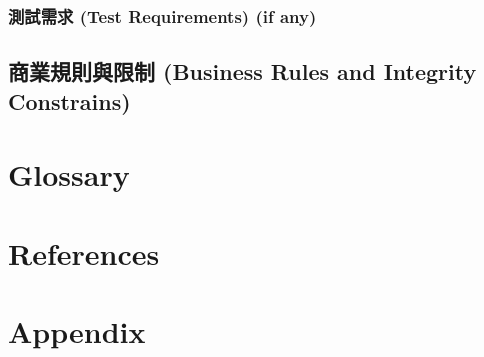 \documentclass[a4paper, 12pt]{article}
\begin{document}
\subsubsection{測試需求 (Test Requirements) (if any)}
\subsection{商業規則與限制 (Business Rules and Integrity Constrains)}
\newpage

\section{Glossary}
\newpage

\section{References}
\newpage

\section{Appendix}
\newpage
\end{document}
